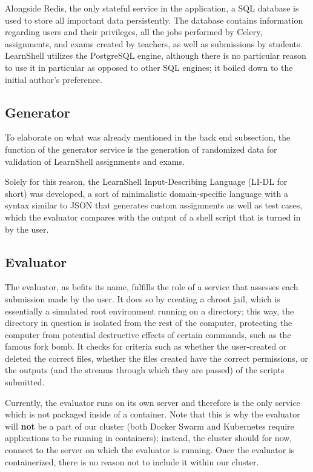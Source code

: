 \documentclass[thesis=B,english]{FITthesis}[2019/12/23]
\begin{document}
Alongside Redis, the only stateful service in the application, a SQL database is used to store all important data persistently. The database contains information regarding users and their privileges, all the jobs performed by Celery, assignments, and exams created by teachers, as well as submissions by students. LearnShell utilizes the PostgreSQL engine, although there is no particular reason to use it in particular as opposed to other SQL engines; it boiled down to the initial author's preference.

\subsection{Generator}

To elaborate on what was already mentioned in the back end subsection, the function of the generator service is the generation of randomized data for validation of LearnShell assignments and exams. 

Solely for this reason, the LearnShell Input-Describing Language (LI-DL for short) was developed, a sort of minimalistic domain-specific language with a syntax similar to JSON that generates custom assignments as well as test cases, which the evaluator compares with the output of a shell script that is turned in by the user. \cite{learnshell-jilek}  
 
\subsection{Evaluator}

The evaluator, as befits its name, fulfills the role of a service that assesses each submission made by the user. It does so by creating a chroot jail, which is essentially a simulated root environment running on a directory; this way, the directory in question is isolated from the rest of the computer, protecting the computer from potential destructive effects of certain commands, such as the famous fork bomb. \cite{unix-handbook} It checks for criteria such as whether the user-created or deleted the correct files, whether the files created have the correct permissions, or the outputs (and the streams through which they are passed) of the scripts submitted.

Currently, the evaluator runs on its own server and therefore is the only service which is not packaged inside of a container. Note that this is why the evaluator will \textbf{not} be a part of our cluster (both Docker Swarm and Kubernetes require applications to be running in containers); instead, the cluster should for now, connect to the server on which the evaluator is running. Once the evaluator is containerized, there is no reason not to include it within our cluster.
\end{document}
